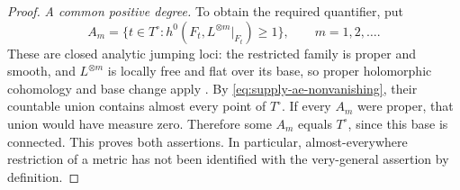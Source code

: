 \begin{proof}
\smallskip\noindent
\emph{A common positive degree.}
To obtain the required quantifier, put
\[
 A_m=\bigl\{t\in T^\circ:
    h^0(F_t,L^{\otimes m}|_{F_t})\geq1\bigr\},
 \qquad m=1,2,\ldots .
\]
These are closed analytic jumping loci: the restricted family is proper
and smooth, and $L^{\otimes m}$ is locally free and flat over its base,
so proper holomorphic cohomology and base change apply
\cite[\S8, Theorem~3, p.~62]{Douady1974}.  By
\eqref{eq:supply-ae-nonvanishing}, their countable union contains almost
every point of $T^\circ$.  If every $A_m$ were proper, that union would
have measure zero.  Therefore some $A_m$ equals $T^\circ$, since this
base is connected.  This proves both assertions.  In particular,
almost-everywhere restriction of a metric has not been identified with
the very-general assertion by definition.
\end{proof}
